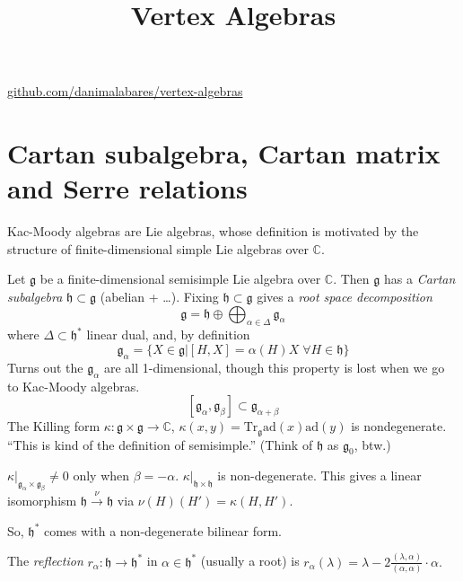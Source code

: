 



\title{Vertex Algebras}
\maketitle

\label{section-phantom}
\hfill
\href{http://github.com/danimalabares/vertex-algebras}
{github.com/danimalabares/vertex-algebras}

\tableofcontents

\section{Cartan subalgebra, Cartan matrix and Serre relations}
\label{section-Cartan-subalgebra}

Kac-Moody algebras are Lie algebras, whose definition is motivated by the
structure of finite-dimensional simple Lie algebras over $\mathbb{C}$.

Let $\mathfrak{g}$ be a finite-dimensional semisimple Lie algebra over
$\mathbb{C}$. Then $\mathfrak{g}$ has a {\it Cartan subalgebra} 
$\mathfrak{h}\subset \mathfrak{g}$ (abelian + …). 
Fixing $\mathfrak{h}\subset\mathfrak{g}$ gives a 
{\it root space decomposition}
$$
\mathfrak{g}=\mathfrak{h}\oplus \bigoplus_{\alpha \in \Delta}\mathfrak{g}_\alpha
$$
where $\Delta \subset \mathfrak{h}^*$ linear dual, and, by definition
$$
\mathfrak{g}_\alpha=\{X \in \mathfrak{g}|
[H,X]=\alpha(H)X\; \forall H \in \mathfrak{h}\}
$$
Turns out the $\mathfrak{g}_\alpha$ are all 1-dimensional, 
though this property is lost when we go to Kac-Moody algebras.
$$
[\mathfrak{g}_\alpha,\mathfrak{g}_\beta] \subset \mathfrak{g}_{\alpha+\beta}
$$
The Killing form  $\kappa:\mathfrak{g} \times \mathfrak{g} \to \mathbb{C}$,
 $\kappa(x,y)=\text{Tr}_\mathfrak{g}\text{ad}(x)\text{ad}(y)$ is nondegenerate. 
``This is kind of the definition of semisimple.'' 
(Think of $\mathfrak{h}$ as $\mathfrak{g}_0$, btw.)

$\kappa |_{\mathfrak{g}_\alpha \times \mathfrak{g}_\beta}\neq 0$ only when 
$\beta=-\alpha$. $\kappa |_{\mathfrak{h}\times \mathfrak{h}}$ is non-degenerate. 
 This gives a linear isomorphism 
$\mathfrak{h} \xrightarrow{\nu} \mathfrak{h}$ via 
$\nu(H)(H') = \kappa(H,H')$.

\medskip\noindent
So, $\mathfrak{h}^*$ comes with a non-degenerate bilinear form.

The {\it reflection} $r_\alpha:\mathfrak{h}\to \mathfrak{h}^*$ in 
$\alpha \in \mathfrak{h}^*$ (usually a root) is 
$r_\alpha(\lambda)=\lambda- 2\frac{(\lambda,\alpha)}{(\alpha,\alpha)}
\cdot \alpha.$

